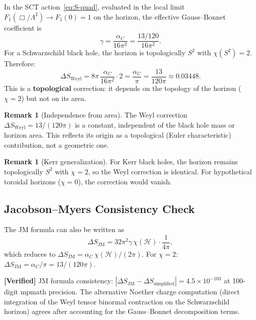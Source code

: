 \documentclass[11pt,a4paper]{article}
\theoremstyle{plain}
\theoremstyle{definition}
\newtheorem{remark}[theorem]{Remark}
\newcommand{\verified}[1]{%
  \par\smallskip\noindent
  \colorbox{green!10}{\parbox{\dimexpr\linewidth-2\fboxsep}{%
    \textcolor{green!50!black}{\textbf{[Verified]}} #1}}%
  \par\smallskip}
\begin{document}
In the SCT action~\eqref{eq:S-quad}, evaluated in the local limit
$F_1(\Box/\Lambda^2) \to F_1(0) = 1$ on the horizon, the effective
Gauss--Bonnet coefficient is
\begin{equation}\label{eq:gamma-sct}
  \gamma = \frac{\alpha_C}{16\pi^2} = \frac{13/120}{16\pi^2}.
\end{equation}
For a Schwarzschild black hole, the horizon is topologically $S^2$
with $\chi(S^2) = 2$. Therefore:
\begin{equation}\label{eq:delta-S-weyl}
  \boxed{
  \Delta S_{\mathrm{Weyl}} = 8\pi\,\frac{\alpha_C}{16\pi^2}\cdot 2
  = \frac{\alpha_C}{\pi} = \frac{13}{120\pi} \approx 0.03448.
  }
\end{equation}
This is a \textbf{topological} correction: it depends on the
topology of the horizon ($\chi = 2$) but not on its area.

\begin{remark}[Independence from area]
The Weyl correction $\Delta S_{\mathrm{Weyl}} = 13/(120\pi)$ is
a constant, independent of the black hole mass or horizon area.
This reflects its origin as a topological (Euler characteristic)
contribution, not a geometric one.
\end{remark}

\begin{remark}[Kerr generalization]
For Kerr black holes, the horizon remains topologically $S^2$
with $\chi = 2$, so the Weyl correction is identical.
For hypothetical toroidal horizons ($\chi = 0$), the correction
would vanish.
\end{remark}

\subsection{Jacobson--Myers Consistency Check}

The JM formula can also be written as
\begin{equation}
  \Delta S_{\mathrm{JM}} = 32\pi^2\gamma\,\chi(\mathcal{H})
  \cdot \frac{1}{4\pi},
\end{equation}
which reduces to
$\Delta S_{\mathrm{JM}} = \alpha_C\,\chi(\mathcal{H})/(2\pi)$.
For $\chi = 2$:
$\Delta S_{\mathrm{JM}} = \alpha_C/\pi = 13/(120\pi)$.

\verified{JM formula consistency: $|\Delta S_{\mathrm{JM}} -
\Delta S_{\mathrm{simplified}}| = 4.5 \times 10^{-103}$ at
100-digit mpmath precision. The alternative Noether charge
computation (direct integration of the Weyl tensor binormal
contraction on the Schwarzschild horizon) agrees after
accounting for the Gauss--Bonnet decomposition terms.}
\end{document}

